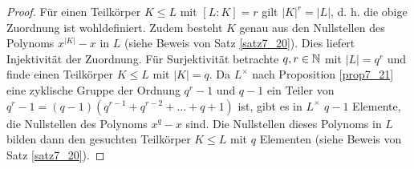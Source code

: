 \begin{proof}
	Für einen Teilkörper $K \leq L$ mit $[L : K] = r$ gilt $|K|^r = |L|$, d. h. die obige Zuordnung ist wohldefiniert. Zudem besteht $K$ genau aus den Nullstellen des Polynoms $x^{|K|} - x$ in $L$ (siehe Beweis von Satz \ref{satz7_20}). Dies liefert Injektivität der Zuordnung. Für Surjektivität betrachte $q,r \in \mathbb{N}$ mit $|L| = q^r$ und finde einen Teilkörper $K \leq L$ mit $|K| = q$. Da $L^\times$ nach Proposition \ref{prop7_21} eine zyklische Gruppe der Ordnung $q^r - 1$ und $q-1$ ein Teiler von $q^r - 1 = (q-1)(q^{r-1} + q^{r-2} + \dots + q + 1)$ ist, gibt es in $L^\times$ $q-1$ Elemente, die Nullstellen des Polynoms $x^q - x$ sind. Die Nullstellen dieses Polynoms in $L$ bilden dann den gesuchten Teilkörper $K \leq L$ mit $q$ Elementen (siehe Beweis von Satz \ref{satz7_20}).
\end{proof}